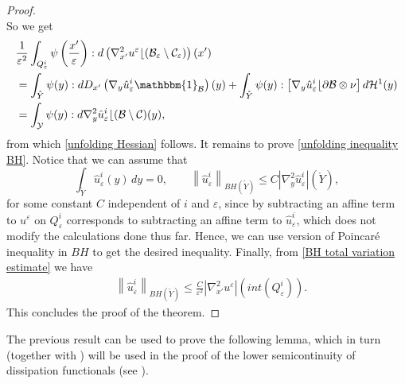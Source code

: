 \documentclass[reqno,10pt]{amsart}
\numberwithin{equation}{section}
\theoremstyle{remark}
\newcommand{\calB}{\mathcal{B}}
\newcommand{\calC}{\mathcal{C}}
\newcommand{\calH}{\mathcal{H}}
\newcommand{\calY}{\mathcal{Y}}
\newcommand{\eps}{\varepsilon}
\newcommand{\mres}[1]{\lfloor{#1}}
\newcommand{\charfun}[1]{\mathbbm{1}_{#1}}
\newcommand{\D}{\nabla}
\begin{document}
\begin{proof}
\begin{equation*}
\end{equation*}
So we get
\begin{align*}
	& \frac{1}{\eps^2} \int_{Q_\eps^i} \psi\left(\frac{x'}{\eps}\right) : d\left({\D}^2_{x'}u^\eps\mres{(\calB_\eps \setminus \calC_\eps)}\right)(x')\\
	& = \int_{\mathring{Y}} \psi(y) : dD_{x'}\left(\nabla_{y}\hat{u}_\eps^i \charfun{\calB}\right)(y)
	+ \int_{\mathring{Y}} \psi(y) : \left[\nabla_{y}\hat{u}_\eps^i\mres{\partial\calB} \otimes \nu\right] d\calH^{1}(y)\\
	& = \int_{\calY} \psi(y) : d{\D}^2_{y}\hat{u}_\eps^i\mres{(\calB \setminus \calC)}(y),
\end{align*}
from which \eqref{unfolding Hessian} follows. 
It remains to prove \eqref{unfolding inequality BH}. 
Notice that we can assume that
\begin{equation*}
	\int_{\mathring{Y}} \hat{u}_\eps^i(y)\,dy=0, \qquad \left\|\hat{u}_\eps^i\right\|_{BH(\mathring{Y})} \leq C |{\D}^2_{y}\hat{u}_\eps^i|(\mathring{Y}),
\end{equation*}
for some constant $C$ independent of $i$ and $\eps$, since by subtracting an affine term to $u^\eps$ on $Q_\eps^i$ corresponds to subtracting an affine term to $\hat{u}_\eps^i$, which does not modify the calculations done thus far. 
Hence, we can use version of Poincar\'{e} inequality in $BH$ to get the desired inequality.
Finally, from \eqref{BH total variation estimate} we have
\begin{align*}
	& \left\|\hat{u}_\eps^i\right\|_{BH(\mathring{Y})} \leq \frac{C}{\eps^2} |{\D}^2_{x'}u^\eps|\left(int(Q_\eps^i)\right).
\end{align*}
This concludes the proof of the theorem.
\end{proof}

The previous result can be used to prove the following lemma, which in turn (together with ) will be used in the proof of the lower semicontinuity of dissipation functionals (see ).
\end{document}
